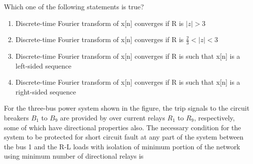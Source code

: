 Which one of the following statements is true?
\begin{enumerate}

        \item Discrete-time Fourier transform of x[n] converges if R is $|z|>3$
        \item Discrete-time Fourier transform of x[n] converges if R is $\frac{2}{3}<|z|<3$
        \item Discrete-time Fourier transform of x[n] converges if R is such that x[n] is a left-sided sequence
        \item Discrete-time Fourier transform of x[n] converges if R is such that x[n] is a right-sided sequence
\end{enumerate}
\bigskip
\item For the three-bus power system shown in the figure, the trip signals to the circuit breakers $B_1$ to $B_9$ are provided by over current relays $R_1$ to $R_9$, respectively, some of which have directional properties also. The necessary condition for the system to be protected for short circuit fault at any part of the system between the bus 1 and the R-L loads with isolation of minimum portion of the network using minimum number of directional relays is
